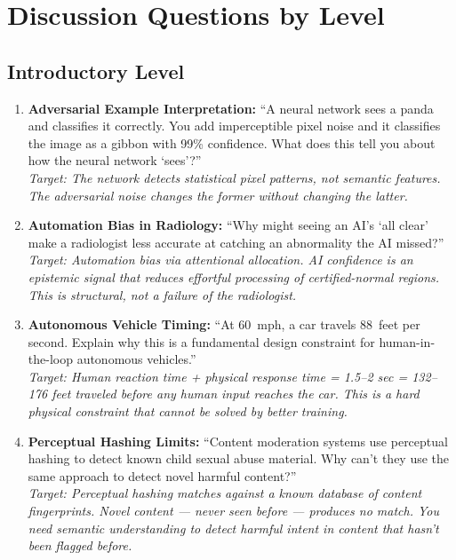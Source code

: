 \section{Discussion Questions by Level}

\subsection{Introductory Level}

\begin{enumerate}
    \item \textbf{Adversarial Example Interpretation:} ``A neural network sees a panda and classifies it correctly. You add imperceptible pixel noise and it classifies the image as a gibbon with 99\% confidence. What does this tell you about how the neural network `sees'?''\\
    \textit{Target: The network detects statistical pixel patterns, not semantic features. The adversarial noise changes the former without changing the latter.}

    \item \textbf{Automation Bias in Radiology:} ``Why might seeing an AI's `all clear' make a radiologist less accurate at catching an abnormality the AI missed?''\\
    \textit{Target: Automation bias via attentional allocation. AI confidence is an epistemic signal that reduces effortful processing of certified-normal regions. This is structural, not a failure of the radiologist.}

    \item \textbf{Autonomous Vehicle Timing:} ``At 60~mph, a car travels 88~feet per second. Explain why this is a fundamental design constraint for human-in-the-loop autonomous vehicles.''\\
    \textit{Target: Human reaction time + physical response time = 1.5--2 sec = 132--176 feet traveled before any human input reaches the car. This is a hard physical constraint that cannot be solved by better training.}

    \item \textbf{Perceptual Hashing Limits:} ``Content moderation systems use perceptual hashing to detect known child sexual abuse material. Why can't they use the same approach to detect novel harmful content?''\\
    \textit{Target: Perceptual hashing matches against a known database of content fingerprints. Novel content --- never seen before --- produces no match. You need semantic understanding to detect harmful intent in content that hasn't been flagged before.}
\end{enumerate}

